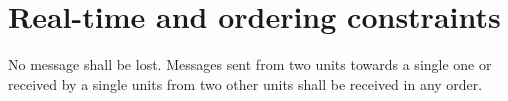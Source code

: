 \chapter{Real-time and ordering constraints}

No message shall be lost. Messages sent from two units towards a
single one or received by a single units from two other units shall be
received in any order.
